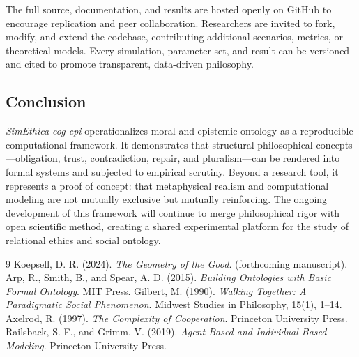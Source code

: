\documentclass[11pt]{article}
\begin{document}
The full source, documentation, and results are hosted openly on GitHub to encourage replication and peer collaboration.  
Researchers are invited to fork, modify, and extend the codebase, contributing additional scenarios, metrics, or theoretical models.  
Every simulation, parameter set, and result can be versioned and cited to promote transparent, data-driven philosophy.

\subsection{Conclusion}

\textit{SimEthica-cog-epi} operationalizes moral and epistemic ontology as a reproducible computational framework.  
It demonstrates that structural philosophical concepts—obligation, trust, contradiction, repair, and pluralism—can be rendered into formal systems and subjected to empirical scrutiny.  
Beyond a research tool, it represents a proof of concept: that metaphysical realism and computational modeling are not mutually exclusive but mutually reinforcing.  
The ongoing development of this framework will continue to merge philosophical rigor with open scientific method, creating a shared experimental platform for the study of relational ethics and social ontology.
\begin{thebibliography}{9}
Koepsell, D. R. (2024). \textit{The Geometry of the Good}. (forthcoming manuscript).
Arp, R., Smith, B., and Spear, A. D. (2015). \textit{Building Ontologies with Basic Formal Ontology}. MIT Press.
Gilbert, M. (1990). \textit{Walking Together: A Paradigmatic Social Phenomenon}. Midwest Studies in Philosophy, 15(1), 1–14.
Axelrod, R. (1997). \textit{The Complexity of Cooperation}. Princeton University Press.
Railsback, S. F., and Grimm, V. (2019). \textit{Agent-Based and Individual-Based Modeling}. Princeton University Press.
\end{thebibliography}
\end{document}
